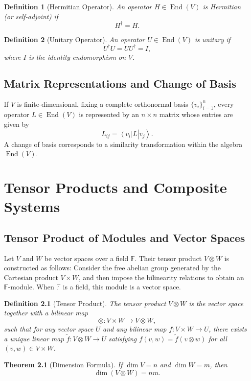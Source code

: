 \documentclass[11pt,oneside]{book}
\newtheorem{definition}{Definition}[chapter]
\newtheorem{theorem}{Theorem}[chapter]
\theoremstyle{remark}
\renewcommand{\ket}[1]{\left| #1 \right\rangle}
\renewcommand{\bra}[1]{\left\langle #1 \right|}
\begin{document}
	\begin{definition}[Hermitian Operator]
		An operator $H\in\operatorname{End}(V)$ is \emph{Hermitian} (or self-adjoint) if
		\[
		H^\dagger = H.
		\]
	\end{definition}
	
	\begin{definition}[Unitary Operator]
		An operator $U\in\operatorname{End}(V)$ is \emph{unitary} if
		\[
		U^\dagger U = U U^\dagger = I,
		\]
		where $I$ is the identity endomorphism on $V$.
	\end{definition}
	
	\section{Matrix Representations and Change of Basis}
	If $V$ is finite-dimensional, fixing a complete orthonormal basis $\{v_i\}_{i=1}^n$, every operator $L\in \operatorname{End}(V)$ is represented by an $n \times n$ matrix whose entries are given by
	\[
	L_{ij} = \bra{v_i} L \ket{v_j}.
	\]
	A change of basis corresponds to a similarity transformation within the algebra $\operatorname{End}(V)$.
	
	\chapter{Tensor Products and Composite Systems}
	\section{Tensor Product of Modules and Vector Spaces}
	Let $V$ and $W$ be vector spaces over a field $\mathbb{F}$. Their tensor product $V \otimes W$ is constructed as follows: Consider the free abelian group generated by the Cartesian product $V \times W$, and then impose the bilinearity relations to obtain an $\mathbb{F}$-module. When $\mathbb{F}$ is a field, this module is a vector space.
	
	\begin{definition}[Tensor Product]
		The \emph{tensor product} $V \otimes W$ is the vector space together with a bilinear map
		\[
		\otimes: V \times W \to V \otimes W,
		\]
		such that for any vector space $U$ and any bilinear map $f: V \times W \to U$, there exists a unique linear map $\tilde{f}: V \otimes W \to U$ satisfying $f(v,w)=\tilde{f}(v\otimes w)$ for all $(v,w)\in V\times W$.
	\end{definition}
	
	\begin{theorem}[Dimension Formula]
		If $\dim V = n$ and $\dim W = m$, then
		\[
		\dim (V \otimes W) = nm.
		\]
	\end{theorem}
	
\end{document}
